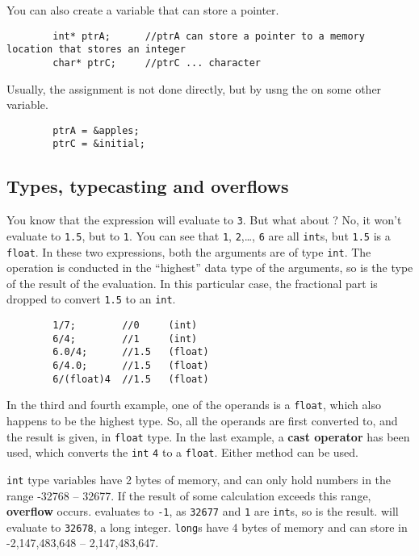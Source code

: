 \documentclass{article}
\begin{document}
		You can also create a variable that can store a pointer.

		\begin{lstlisting}
		int* ptrA;		//ptrA can store a pointer to a memory location that stores an integer
		char* ptrC;		//ptrC ... character
		\end{lstlisting}

		Usually, the assignment is not done directly, but by usng the \inlncd{\&} on some other variable.

		\begin{lstlisting}
		ptrA = &apples;
		ptrC = &initial;
		\end{lstlisting}

	\subsection{Types, typecasting and overflows}

		You know that the expression  will evaluate to \texttt{3}. But what about ? No, it won't evaluate to \texttt{1.5}, but to \texttt{1}. You can see that \texttt{1}, \texttt{2},\ldots, \texttt{6} are all \texttt{int}s, but \texttt{1.5} is a \texttt{float}. In these two expressions, both the arguments are of type \texttt{int}. The operation is conducted in the ``highest'' data type of the arguments, so is the type of the result of the evaluation. In this particular case, the fractional part is dropped to convert \texttt{1.5} to an \texttt{int}.

		\begin{lstlisting}
		1/7;		//0		(int)
		6/4;		//1		(int)
		6.0/4;		//1.5	(float)
		6/4.0;		//1.5	(float)
		6/(float)4	//1.5	(float)
		\end{lstlisting}

		In the third and fourth example, one of the operands is a \texttt{float}, which also happens to be the highest type. So, all the operands are first converted to, and the result is given, in \texttt{float} type. In the last example, a \textbf{cast operator} has been used, which converts the \texttt{int} \texttt{4} to a \texttt{float}. Either method can be used.

		\texttt{int} type variables have 2 bytes of memory, and can only hold numbers in the range -32768 -- 32677. If the result of some calculation exceeds this range, \textbf{overflow} occurs.  evaluates to \texttt{-1}, as \texttt{32677} and \texttt{1} are \texttt{int}s, so is the result.  will evaluate to \texttt{32678}, a long integer. \texttt{long}s have 4 bytes of memory and can store in -2,147,483,648 -- 2,147,483,647.
\end{document}
